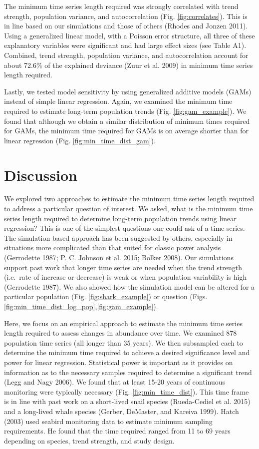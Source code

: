 \documentclass[12pt,]{article}
\begin{document}
The minimum time series length required was strongly correlated with
trend strength, population variance, and autocorrelation (Fig.
\ref{fig:correlates}). This is in line based on our simulations and
those of others (Rhodes and Jonzen 2011). Using a generalized linear
model, with a Poisson error structure, all three of these explanatory
variables were significant and had large effect sizes (see Table A1).
Combined, trend strength, population variance, and autocorrelation
account for about 72.6\% of the explained deviance (Zuur et al. 2009) in
minimum time series length required.

Lastly, we tested model sensitivity by using generalized additive models
(GAMs) instead of simple linear regression. Again, we examined the
minimum time required to estimate long-term population trends (Fig.
\ref{fig:gam_example}). We found that although we obtain a similar
distribution of minimum times required for GAMs, the minimum time
required for GAMs is on average shorter than for linear regression (Fig.
\ref{fig:min_time_dist_gam}).

\section{Discussion}\label{discussion}

We explored two approaches to estimate the minimum time series length
required to address a particular question of interest. We asked, what is
the minimum time series length required to determine long-term
population trends using linear regression? This is one of the simplest
questions one could ask of a time series. The simulation-based approach
has been suggested by others, especially in situations more complicated
than that suited for classic power analysis (Gerrodette 1987; P. C.
Johnson et al. 2015; Bolker 2008). Our simulations support past work
that longer time series are needed when the trend strength (i.e.~rate of
increase or decrease) is weak or when population variability is high
(Gerrodette 1987). We also showed how the simulation model can be
altered for a particular population (Fig. \ref{fig:shark_example}) or
question (Figs. \ref{fig:min_time_dist_log_pop},\ref{fig:gam_example}).

Here, we focus on an empirical approach to estimate the minimum time
series length required to assess changes in abundance over time. We
examined 878 population time series (all longer than 35 years). We then
subsampled each to determine the minimum time required to achieve a
desired significance level and power for linear regression. Statistical
power is important as it provides on information as to the necessary
samples required to determine a significant trend (Legg and Nagy 2006).
We found that at least 15-20 years of continuous monitoring were
typically necessary (Fig. \ref{fig:min_time_dist}). This time frame is
in line with past work on a short-lived snail species (Rueda-Cediel et
al. 2015) and a long-lived whale species (Gerber, DeMaster, and Kareiva
1999). Hatch (2003) used seabird monitoring data to estimate minimum
sampling requirements. He found that the time required ranged from 11 to
69 years depending on species, trend strength, and study design.
\end{document}
